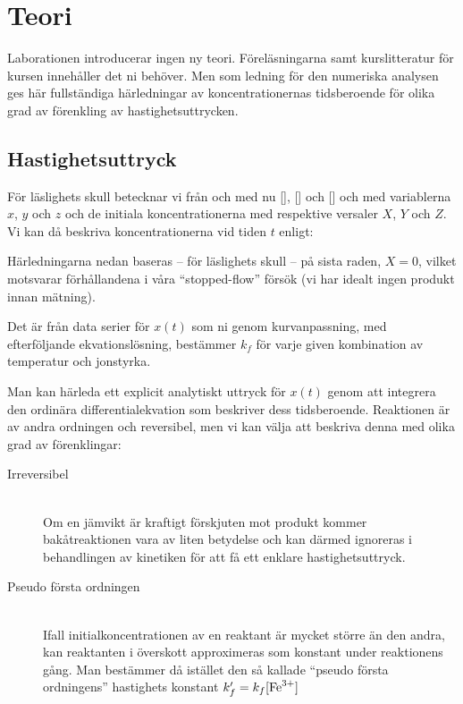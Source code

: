 \section{Teori}
\label{sec:teori}
Laborationen introducerar ingen ny teori. Föreläsningarna samt
kurslitteratur för kursen innehåller det ni behöver. Men som ledning för
den numeriska analysen ges här fullständiga härledningar av
koncentrationernas tidsberoende för olika grad av förenkling av
hastighetsuttrycken.

\subsection{Hastighetsuttryck}
För läslighets skull betecknar vi från och med nu [],
[] och [] och med variablerna $x$, $y$ och $z$ och de
initiala koncentrationerna med respektive versaler $X$, $Y$ och $Z$. Vi
kan då beskriva koncentrationerna vid tiden $t$ enligt:



Härledningarna nedan baseras -- för läslighets skull -- på sista raden,
$X=0$, vilket motsvarar förhållandena i våra ``stopped-flow'' försök (vi har
idealt ingen produkt innan mätning).

Det är från data serier för $x(t)$ som ni genom kurvanpassning, med
efterföljande ekvationslösning, bestämmer $k_f$ för varje given
kombination av temperatur och jonstyrka.

Man kan härleda ett explicit analytiskt uttryck för $x(t)$ genom att
integrera den ordinära differentialekvation som beskriver dess
tidsberoende. Reaktionen är av andra ordningen och reversibel, men vi kan
välja att beskriva denna med olika grad av förenklingar:
\begin{description}
\item[Irreversibel] \hfill \\
  Om en jämvikt är kraftigt förskjuten mot produkt kommer
  bakåtreaktionen vara av liten betydelse och kan därmed
  ignoreras i behandlingen av kinetiken för att få
  ett enklare hastighetsuttryck.
\item[Pseudo första ordningen] \hfill \\ %
  Ifall initialkoncentrationen av en reaktant är mycket större än den andra,
  kan reaktanten i överskott approximeras som konstant under reaktionens
  gång. Man bestämmer då istället den så kallade ``pseudo första ordningens''
  hastighets konstant $k_f' = k_f[\ce{Fe^3+}]$
\end{description}

